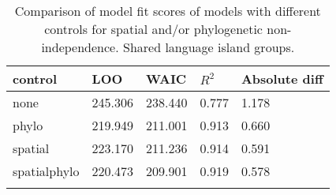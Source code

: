 \begin{longtable}{p{2cm}p{2cm}p{2cm}p{2cm}p{2cm}}
  \toprule
control & LOO & WAIC & $R^2$ & Absolute diff \\ 
  \midrule
none & 245.306 & 238.440 & 0.777 & 1.178 \\ 
  phylo & 219.949 & 211.001 & 0.913 & 0.660 \\ 
  spatial & 223.170 & 211.236 & 0.914 & 0.591 \\ 
  spatialphylo & 220.473 & 209.901 & 0.919 & 0.578 \\ 
   \bottomrule
\caption{Comparison of model fit scores of models with different controls for spatial and/or phylogenetic non-independence. Shared language island groups.} 
\label{model_fit_score_table_medium}
\end{longtable}

